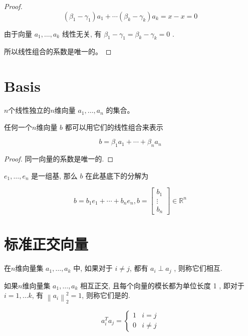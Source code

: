 \begin{proof}
$$
\left(\beta_{1}-\gamma_{1}\right) a_{1}+\cdots\left(\beta_{k}-\gamma_{k}\right) a_{k}=x-x=0
$$

由于向量 $ a_{1}, \ldots, a_{k} $ 线性无关, 有 $ \beta_{1}-\gamma_{1}=\beta_{k}-\gamma_{k}=0 $ . 

所以线性组合的系数是唯一的。
\end{proof}

\section{Basis}

\begin{definition}[基 (Basis)]
    $n$个线性独立的$n$维向量 $ a_{1}, \ldots, a_{n} $ 的集合。
\end{definition}

\begin{definition}
    任何一个$n$维向量 $ b $ 都可以用它们的线性组合来表示

$$
b=\beta_{1} a_{1}+\cdots+\beta_{n} a_{n}
$$
\end{definition}

\begin{proof}
    同一向量的系数是唯一的. 
\end{proof}

\begin{example}
    $ e_{1}, \ldots, e_{n} $ 是一组基, 那么 $ b $ 在此基底下的分解为

    $$ b=b_{1} e_{1}+\cdots+b_{n} e_{n} ,b=\left[\begin{array}{c}b_{1} \\ \vdots \\ b_{n}\end{array}\right] \in \mathbb{R}^{n} $$
\end{example}

\section{标准正交向量}

\begin{definition}
    \label{Def:OrthogonalVectors}
    在$n$维向量集 $ a_{1}, \ldots, a_{k} $ 中,  如果对于 $ i \neq j $, 都有 $ a_{i} \perp a_{j} $ ,  则称它们相互. 
\end{definition}

\begin{definition}
    \label{Def:OrthonormalVectors}
    如果$n$维向量集 $ a_{1}, \ldots, a_{k} $ 相互正交, 且每个向量的模长都为单位长度 1 ,  即对于 $ i=1, \ldots k $, 有 $ \left\|a_{i}\right\|_{2}^{2}=1 $, 则称它们是的. 

    $$ a_{i}^{T} a_{j}=\left\{\begin{array}{ll}1 & i=j \\ 0 & i \neq j\end{array}\right. $$
\end{definition}

